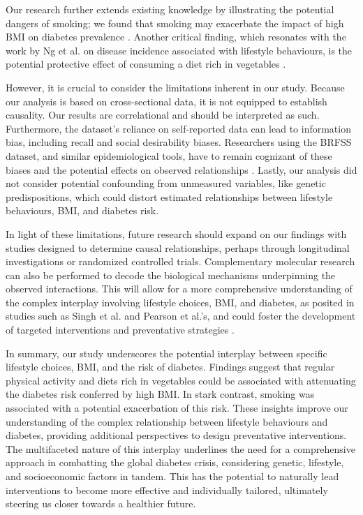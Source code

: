 \documentclass[11pt]{article}
\begin{document}
Our research further extends existing knowledge by illustrating the potential dangers of smoking; we found that smoking may exacerbate the impact of high BMI on diabetes prevalence \cite{Ng2019SmokingDD, Shi2013PhysicalAS}. Another critical finding, which resonates with the work by Ng et al. on disease incidence associated with lifestyle behaviours, is the potential protective effect of consuming a diet rich in vegetables \cite{Ng2019SmokingDD, Lv2017AdherenceTA}.

However, it is crucial to consider the limitations inherent in our study. Because our analysis is based on cross-sectional data, it is not equipped to establish causality. Our results are correlational and should be interpreted as such. Furthermore, the dataset's reliance on self-reported data can lead to information bias, including recall and social desirability biases. Researchers using the BRFSS dataset, and similar epidemiological tools, have to remain cognizant of these biases and the potential effects on observed relationships \cite{Bernab-Ortiz2015ContributionOM}. Lastly, our analysis did not consider potential confounding from unmeasured variables, like genetic predispositions, which could distort estimated relationships between lifestyle behaviours, BMI, and diabetes risk.

In light of these limitations, future research should expand on our findings with studies designed to determine causal relationships, perhaps through longitudinal investigations or randomized controlled trials. Complementary molecular research can also be performed to decode the biological mechanisms underpinning the observed interactions. This will allow for a more comprehensive understanding of the complex interplay involving lifestyle choices, BMI, and diabetes, as posited in studies such as Singh et al. and Pearson et al.'s, and could foster the development of targeted interventions and preventative strategies \cite{Singh2013TheAQ, Pearson2010AssociationBF}.

In summary, our study underscores the potential interplay between specific lifestyle choices, BMI, and the risk of diabetes. Findings suggest that regular physical activity and diets rich in vegetables could be associated with attenuating the diabetes risk conferred by high BMI. In stark contrast, smoking was associated with a potential exacerbation of this risk. These insights improve our understanding of the complex relationship between lifestyle behaviours and diabetes, providing additional perspectives to design preventative interventions. The multifaceted nature of this interplay underlines the need for a comprehensive approach in combatting the global diabetes crisis, considering genetic, lifestyle, and socioeconomic factors in tandem. This has the potential to naturally lead interventions to become more effective and individually tailored, ultimately steering us closer towards a healthier future.
\end{document}

